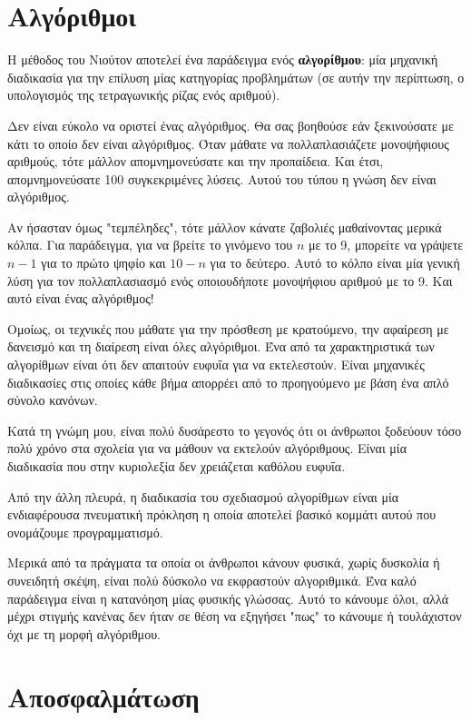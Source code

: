 \documentclass[10pt]{book}
\begin{document}
\section{Αλγόριθμοι}

Η μέθοδος του Νιούτον αποτελεί ένα παράδειγμα ενός {\bf αλγορίθμου}: 
μία μηχανική διαδικασία για την επίλυση μίας κατηγορίας προβλημάτων
(σε αυτήν την περίπτωση, ο υπολογισμός της τετραγωνικής ρίζας ενός αριθμού).

Δεν είναι εύκολο να οριστεί ένας αλγόριθμος. Θα σας βοηθούσε εάν ξεκινούσατε με κάτι το οποίο δεν είναι αλγόριθμος. Όταν μάθατε να πολλαπλασιάζετε μονοψήφιους αριθμούς, τότε μάλλον απομνημονεύσατε και την προπαίδεια. Και έτσι, απομνημονεύσατε 100 συγκεκριμένες λύσεις. Αυτού του τύπου η γνώση δεν είναι αλγόριθμος.

Αν ήσασταν όμως "τεμπέληδες", τότε μάλλον κάνατε ζαβολιές μαθαίνοντας μερικά κόλπα. Για παράδειγμα, για να βρείτε το γινόμενο του $n$ με το 9, μπορείτε να γράψετε $n-1$ για το πρώτο ψηφίο και $10-n$ για το δεύτερο. Αυτό το κόλπο είναι μία γενική λύση για τον πολλαπλασιασμό ενός οποιουδήποτε μονοψήφιου αριθμού με το 9. Και αυτό είναι ένας αλγόριθμος!

Ομοίως, οι τεχνικές που μάθατε για την πρόσθεση με κρατούμενο, την αφαίρεση με
δανεισμό και τη διαίρεση είναι όλες αλγόριθμοι. Ένα από τα χαρακτηριστικά των
αλγορίθμων είναι ότι δεν απαιτούν ευφυΐα για να εκτελεστούν. Είναι μηχανικές διαδικασίες στις οποίες κάθε βήμα απορρέει από το προηγούμενο με βάση ένα απλό σύνολο κανόνων.

Κατά τη γνώμη μου, είναι πολύ δυσάρεστο το γεγονός ότι οι άνθρωποι ξοδεύουν τόσο πολύ χρόνο στα σχολεία για να μάθουν να εκτελούν αλγόριθμους. Είναι μία διαδικασία που στην κυριολεξία δεν χρειάζεται καθόλου ευφυΐα.

Από την άλλη πλευρά, η διαδικασία του σχεδιασμού αλγορίθμων είναι μία ενδιαφέρουσα πνευματική πρόκληση η οποία αποτελεί βασικό κομμάτι αυτού που ονομάζουμε προγραμματισμό.

Μερικά από τα πράγματα τα οποία οι άνθρωποι κάνουν φυσικά, χωρίς δυσκολία ή συνειδητή σκέψη, είναι πολύ δύσκολο να εκφραστούν αλγοριθμικά. Ένα καλό παράδειγμα είναι η κατανόηση μίας φυσικής γλώσσας. Αυτό το κάνουμε όλοι, αλλά μέχρι στιγμής κανένας δεν ήταν σε θέση να εξηγήσει "πως" το κάνουμε ή τουλάχιστον όχι με τη μορφή αλγόριθμου.


\section{Αποσφαλμάτωση}
\end{document}
